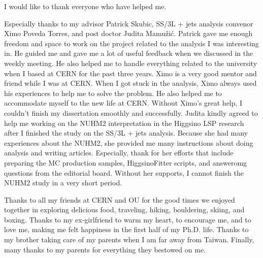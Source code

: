 I would like to thank everyone who have helped me.

Especially thanks to my advisor Patrick Skubic, SS/3L + jets analysis convenor Ximo Poveda Torres, and post doctor Judita Mamu\v{z}i\'{c}.
%
Patrick gave me enough freedom and space to work on the project related to the analysis I was interesting in.
He guided me and gave me a lot of useful feedback when we discussed in the weekly meeting.
He also helped me to handle everything related to the university when I based at CERN for the past three years.
%
Ximo is a very good mentor and friend while I was at CERN.
When I got stuck in the analysis, Ximo always used his experiences to help me to solve the problem.
He also helped me to accommodate myself to the new life at CERN.
Without Ximo's great help, I couldn't finish my dissertation smoothly and successfully.
%
Judita kindly agreed to help me working on the NUHM2 interpretation in the Higgsino LSP research after I finished the study on the SS/3L + jets analysis.
Because she had many experiences about the NUHM2, she provided me many instructions about doing analysis and writing articles.
Especially, thank for her efforts that include preparing the MC production samples, HiggsinoFitter scripts, and answeromg questions from the editorial board.
Without her supports, I cannot finish the NUHM2 study in a very short period.
%

Thanks to all my friends at CERN and OU for the good times we enjoyed together in exploring delicious food, traveling, hiking, bouldering, skiing, and boxing.
Thanks to my ex-girlfriend to warm my heart, to encourage me, and to love me, making me felt happiness in the first half of my Ph.D. life.
Thanks to my brother taking care of my parents when I am far away from Taiwan.
Finally, many thanks to my parents for everything they bestowed on me.



